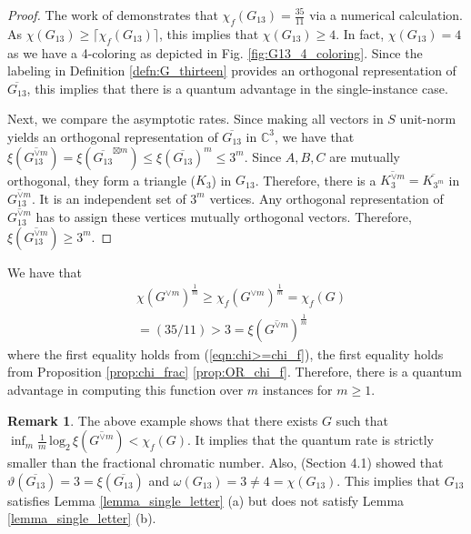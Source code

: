 \documentclass[journal, onecolumn, draftcls]{IEEEtran}
\theoremstyle{definition}
\newtheorem{remark}{Remark}
\newcommand{\bbC}{\mathbb{C}}
\begin{document}
\begin{proof}
     The work of \cite{GuptaSXCA_23} demonstrates that $\chi_f(G_{13}) = \frac{35}{11}$ via a numerical calculation. As $\chi(G_{13}) \geq \lceil \chi_f(G_{13}) \rceil$, this implies that $\chi(G_{13}) \ge 4$. In fact, $\chi(G_{13}) = 4$ as we have a 4-coloring as depicted in Fig. \ref{fig:G13_4_coloring}. Since the labeling in Definition \ref{defn:G_thirteen} provides an orthogonal representation of $\overline{G_{13}}$, this implies that there is a quantum advantage in the single-instance case. 
     
     Next, we compare the asymptotic rates. Since making all vectors in $S$ unit-norm yields an orthogonal representation of $\overline{G_{13}}$ in $\bbC^3$, we have that $\xi(\overline{G_{13}^{\lor m}}) = \xi(\overline{G_{13}}^{\boxtimes m}) \le \xi(\overline{G_{13}})^m \le 3^m$. Since $A,B,C$ are mutually orthogonal, they form a triangle ($K_3$) in $G_{13}$. Therefore, there is a $\overline{K_3^{\lor m}} = \overline{K_{3^m}}$ in $\overline{G_{13}^{\lor m}}$. It is an independent set of $3^m$ vertices. Any orthogonal representation of $\overline{G_{13}^{\lor m}}$ has to assign these vertices mutually orthogonal vectors. Therefore, $\xi(\overline{G_{13}^{\lor m}})\ge3^m$. 
\end{proof}
  We have that 
\begin{align*}
   & \chi(G^{\lor m})^{\frac{1}{m}} \ge \chi_f(G^{\lor m})^{\frac{1}{m}} =  \chi_f(G)  \\&= (35/11)  >3=\xi(\overline{G^{\lor m}})^{\frac{1}{m}}
\end{align*}
where the first equality holds from   (\ref{eqn:chi>=chi_f}), the first equality holds from Proposition \ref{prop:chi_frac} \ref{prop:OR_chi_f}.
Therefore, there is a quantum advantage in computing this function over $m$ instances for $m\ge 1$.

\begin{remark}
    The above example shows that there exists $G$ such that $\inf_m\frac{1}{m}\,\text{log}_2\,\xi(\overline{G^{\lor m}}) < \chi_f(G)$. It implies that the quantum rate is strictly smaller than the fractional chromatic number. Also,  \cite{ManinskaR16} (Section 4.1) showed that $\vartheta(\overline{G_{13}})= 3=\xi(\overline{G_{13}})$ and $\omega(G_{13})=3\ne 4=\chi(G_{13})$. This implies that $G_{13}$ satisfies  Lemma \ref{lemma_single_letter} (a) but does not satisfy Lemma \ref{lemma_single_letter} (b).
\end{remark} 
\end{document}
